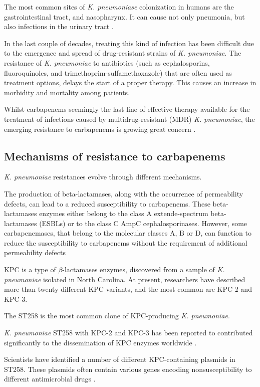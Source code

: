 \documentclass[11pt]{report}
\begin{document}
The most common sites of \emph{K. pneumoniase} colonization in humans are the gastrointestinal tract, and nasopharynx.
It can cause not only pneumonia, but also infections in the urinary tract \cite{Pitout2015, podschun1998klebsiella}.

In the last couple of decades, treating this kind of infection has been difficult due to the emergence and spread of drug-resistant strains of \emph{K. pneumoniae}.
The resistance of \emph{K. pneumoniae} to antibiotics (such as cephalosporins, fluoroquinoles, and trimethoprim-sulfamethoxazole) that are often used as treatment options, delays the start of a proper therapy.
This causes an increase in morbidity and mortality among patients.

Whilst carbapenems seemingly the last line of effective therapy available for the treatment of infections caused by multidrug-resistant (MDR) \emph{K. pneumoniae}, the emerging resistance to carbapenems is growing great concern
 \cite{Pitout2015}.

\subsection{Mechanisms of resistance to carbapenems} 

\emph{K. pneumoniae} resistances evolve through different mechanisms.

The production of beta-lactamases, along with the occurrence of permeability defects, can lead to a reduced susceptibility to carbapenems.
These beta-lactamases enzymes either belong to the class A extende-spectrum beta-lactamases (ESBLs) or to the class C AmpC cephalosporinases.
However, some carbapenemases, that belong to the molecular classes A, B or D, can function to reduce the susceptibility to carbapenems without the requirement of additional permeability defects

KPC is a type of $\beta$-lactamases enzymes, discovered from a sample of \emph{K. pneumoniae} isolated in North Carolina. At present, researchers have described more than twenty different KPC variants, and the most common are KPC-2 and KPC-3.

The ST258 is the most common clone of KPC-producing \emph{K. pneumoniae}.  

\emph{K. pneumoniae} ST258 with KPC-2 and KPC-3 has been reported to contributed significantly to the dissemination of KPC enzymes worldwide \cite{Pitout2015}.

Scientists have identified a number of different KPC-containing plasmids in ST258. These plasmids often contain various genes encoding nonsusceptibility to different antimicrobial drugs \cite{Pitout2015}.
\end{document}
